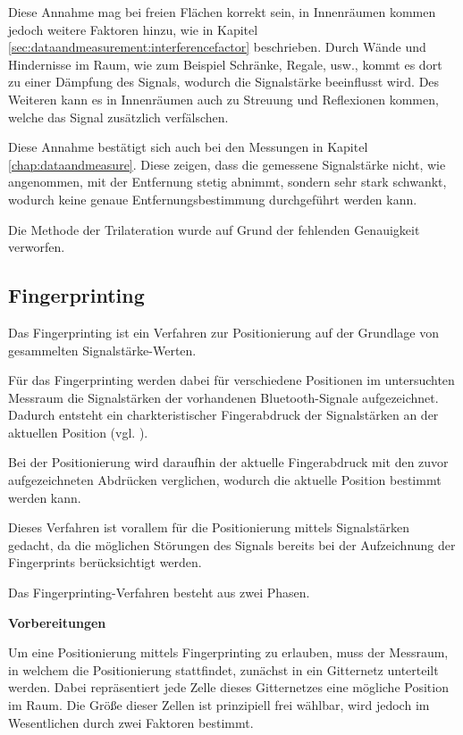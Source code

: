 Diese Annahme mag bei freien Flächen korrekt sein, in Innenräumen kommen jedoch weitere Faktoren hinzu, wie in Kapitel \ref{sec:dataandmeasurement:interferencefactor} beschrieben. 
Durch Wände und Hindernisse im Raum, wie zum Beispiel Schränke, Regale, usw., kommt es dort zu einer Dämpfung des Signals, wodurch die Signalstärke beeinflusst wird. Des Weiteren kann es in Innenräumen auch zu Streuung und Reflexionen kommen, welche das Signal zusätzlich verfälschen.

Diese Annahme bestätigt sich auch bei den Messungen in Kapitel \ref{chap:dataandmeasure}. Diese zeigen, dass die gemessene Signalstärke nicht, wie angenommen, mit der Entfernung stetig abnimmt, sondern sehr stark schwankt, wodurch keine genaue Entfernungsbestimmung durchgeführt werden kann.

Die Methode der Trilateration wurde auf Grund der fehlenden Genauigkeit verworfen. 

\subsection{Fingerprinting}
\label{sec:implementation:positioning:fingerprinting}
Das Fingerprinting ist ein Verfahren zur Positionierung auf der Grundlage von gesammelten Signalstärke-Werten.

Für das Fingerprinting werden dabei für verschiedene Positionen im untersuchten Messraum die Signalstärken der vorhandenen Bluetooth-Signale aufgezeichnet. 
Dadurch entsteht ein charkteristischer Fingerabdruck der Signalstärken an der aktuellen Position (vgl. \citet{wififingerprinting}).

Bei der Positionierung wird daraufhin der aktuelle Fingerabdruck mit den zuvor aufgezeichneten Abdrücken verglichen, wodurch die aktuelle Position bestimmt werden kann.

Dieses Verfahren ist vorallem für die Positionierung mittels Signalstärken gedacht, da die möglichen Störungen des Signals bereits bei der Aufzeichnung der Fingerprints berücksichtigt werden.

Das Fingerprinting-Verfahren besteht aus zwei Phasen.


\textbf{Vorbereitungen}

Um eine Positionierung mittels Fingerprinting zu erlauben, muss der Messraum, in welchem die Positionierung stattfindet, zunächst in ein Gitternetz unterteilt werden. Dabei repräsentiert jede Zelle dieses Gitternetzes eine mögliche Position im Raum.
Die Größe dieser Zellen ist prinzipiell frei wählbar, wird jedoch im Wesentlichen durch zwei Faktoren bestimmt. 

